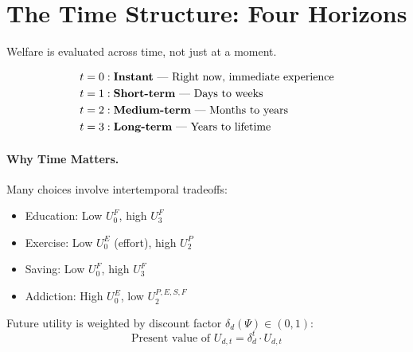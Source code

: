 
\section{The Time Structure: Four Horizons}
\label{sec:fepsde-time}


Welfare is evaluated across time, not just at a moment.

\begin{definition}
\label{def:time-horizons}
\begin{align}
  t = 0 &: \text{\textbf{Instant} --- Right now, immediate experience} \\
  t = 1 &: \text{\textbf{Short-term} --- Days to weeks} \\
  t = 2 &: \text{\textbf{Medium-term} --- Months to years} \\
  t = 3 &: \text{\textbf{Long-term} --- Years to lifetime}
\end{align}
\end{definition}

\paragraph{Why Time Matters.}
Many choices involve intertemporal tradeoffs:
\begin{itemize}[nosep]
  \item Education: Low $U^F_0$, high $U^F_3$
  \item Exercise: Low $U^E_0$ (effort), high $U^P_2$
  \item Saving: Low $U^F_0$, high $U^F_3$
  \item Addiction: High $U^E_0$, low $U^{P,E,S,F}_2$
\end{itemize}

\begin{definition}[Discounting]
Future utility is weighted by discount factor $\delta_d(\Psi) \in (0, 1)$:
\begin{equation}
  \text{Present value of } U_{d,t} = \delta_d^t \cdot U_{d,t}
  \label{eq:discounting}
\end{equation}
\end{definition}

